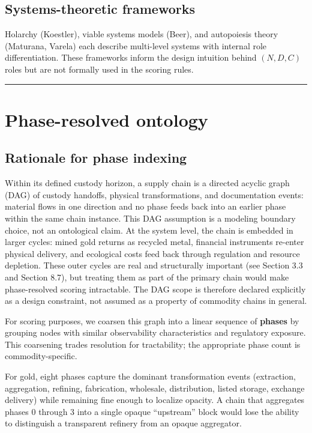 \documentclass[12pt]{article}
\begin{document}
\subsection{Systems-theoretic frameworks}\label{systems-theoretic-frameworks}

Holarchy (Koestler), viable systems models (Beer), and autopoiesis
theory (Maturana, Varela) each describe multi-level systems with
internal role differentiation. These frameworks inform the design
intuition behind \((N, D, C)\) roles but are not formally used in the
scoring rules.

\begin{center}\rule{0.5\linewidth}{0.5pt}\end{center}

\section{Phase-resolved ontology}\label{phase-resolved-ontology}

\subsection{Rationale for phase indexing}\label{rationale-for-phase-indexing}

Within its defined custody horizon, a supply chain is a directed acyclic
graph (DAG) of custody handoffs, physical transformations, and
documentation events: material flows in one direction and no phase feeds
back into an earlier phase within the same chain instance. This DAG
assumption is a modeling boundary choice, not an ontological claim. At
the system level, the chain is embedded in larger cycles: mined gold
returns as recycled metal, financial instruments re-enter physical
delivery, and ecological costs feed back through regulation and resource
depletion. These outer cycles are real and structurally important (see
Section 3.3 and Section 8.7), but treating them as part of the primary
chain would make phase-resolved scoring intractable. The DAG scope is
therefore declared explicitly as a design constraint, not assumed as a
property of commodity chains in general.

For scoring purposes, we coarsen this graph into a linear sequence of
\textbf{phases} by grouping nodes with similar observability
characteristics and regulatory exposure. This coarsening trades
resolution for tractability; the appropriate phase count is
commodity-specific.

For gold, eight phases capture the dominant transformation events
(extraction, aggregation, refining, fabrication, wholesale,
distribution, listed storage, exchange delivery) while remaining fine
enough to localize opacity. A chain that aggregates phases 0 through 3
into a single opaque ``upstream'' block would lose the ability to
distinguish a transparent refinery from an opaque aggregator.
\end{document}
